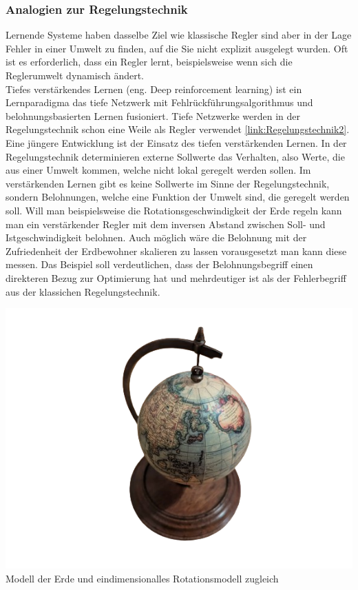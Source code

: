 \subsubsection{Analogien zur Regelungstechnik}
Lernende Systeme haben dasselbe Ziel wie klassische Regler sind aber in der Lage Fehler in einer Umwelt zu finden, auf die Sie nicht explizit ausgelegt wurden. Oft ist es erforderlich, dass ein Regler lernt, beispielsweise wenn sich die Reglerumwelt dynamisch ändert.\\
Tiefes verstärkendes Lernen (eng. Deep reinforcement learning) ist ein Lernparadigma das tiefe Netzwerk mit Fehlrückführungsalgorithmus und belohnungsbasierten Lernen fusioniert. Tiefe Netzwerke werden in der Regelungstechnik schon eine Weile als Regler verwendet \ref{link:Regelungstechnik2}. Eine jüngere Entwicklung ist der Einsatz des tiefen verstärkenden Lernen.
In der Regelungstechnik determinieren externe Sollwerte das Verhalten, also Werte, die aus einer Umwelt kommen, welche nicht lokal geregelt werden sollen. Im verstärkenden Lernen gibt es keine Sollwerte im Sinne der Regelungstechnik, sondern Belohnungen, welche eine Funktion der Umwelt sind, die geregelt werden soll. Will man beispielsweise die Rotationsgeschwindigkeit der Erde regeln kann man ein verstärkender Regler mit dem inversen Abstand zwischen Soll- und Istgeschwindigkeit belohnen. Auch möglich wäre die Belohnung mit der Zufriedenheit der Erdbewohner skalieren zu lassen vorausgesetzt man kann diese messen. Das Beispiel soll verdeutlichen, dass der Belohnungsbegriff einen direkteren Bezug zur Optimierung hat und mehrdeutiger ist als der Fehlerbegriff aus der klassichen Regelungstechnik.
\begin{center}
	\includegraphics[scale=0.26]{../images/0046 Weltmodell ohne Hintergrund.png
	}{\\Modell der Erde und eindimensionalles Rotationsmodell zugleich}
\end{center}

